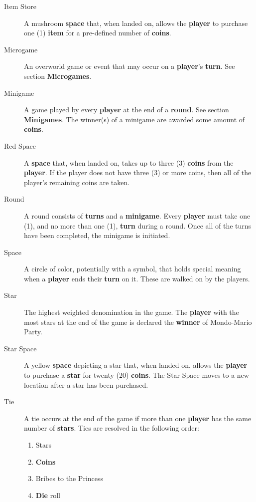 \documentclass{article}
\begin{document}
\begin{description}
\item[Item Store] A mushroom \textbf{space} that, when landed on,
allows the \textbf{player} to purchase one (1) \textbf{item} for a pre-defined
number of \textbf{coins}.

\item[Microgame] An overworld game or event that may occur on a \textbf{player}'s
\textbf{turn}. See section \textbf{Microgames}.

\item[Minigame] A game played by every \textbf{player} at the end of a \textbf{round}.
See section \textbf{Minigames}.  The winner(s) of a minigame are awarded
some amount of \textbf{coins}.

\item[Red Space] A \textbf{space} that, when landed on, takes up to
three (3) \textbf{coins} from the \textbf{player}.  If the player does
not have three (3) or more coins, then all of the player's remaining
coins are taken.

\item[Round] A round consists of \textbf{turns} and a \textbf{minigame}.
Every \textbf{player} must take one (1), and no more than one (1),
\textbf{turn} during a round.  Once all of the turns have been completed,
the minigame is initiated.

\item[Space] A circle of color, potentially with a symbol, that holds
special meaning when a \textbf{player} ends their \textbf{turn} on it.
These are walked on by the players.

\item[Star] The highest weighted denomination in the game.  The \textbf{player}
with the most stars at the end of the game is declared the \textbf{winner}
of Mondo-Mario Party.

\item[Star Space] A yellow \textbf{space} depicting a star that, when landed
on, allows the \textbf{player} to purchase a \textbf{star} for twenty (20)
\textbf{coins}.  The Star Space moves to a new location after a star has been
purchased.

\item[Tie] A tie occurs at the end of the game if more than one \textbf{player}
has the same number of \textbf{stars}.  Ties are resolved in the following order:
\begin{enumerate}
\item Stars
\item \textbf{Coins}
\item Bribes to the Princess
\item \textbf{Die} roll
\end{enumerate}


\end{description}
\end{document}
